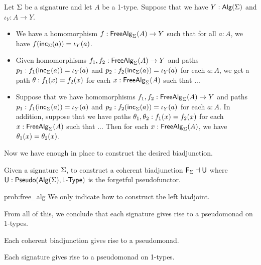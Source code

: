 \begin{corollary}
Let $\Sigma$ be a signature and let $A$ be a 1-type.
Suppose that we have $Y : \mathsf{Alg}(\Sigma)$ and $\iota_Y : A \rightarrow Y$.
\begin{itemize}
	\item We have a homomorphism $f : \mathsf{FreeAlg}_{\Sigma}(A) \rightarrow Y$ such that for all $a : A$, we have $f(\mathsf{inc}_{\Sigma}(a)) = \iota_Y(a)$.
	\item
	Given homomorphisms $f_1, f_2 : \mathsf{FreeAlg}_{\Sigma}(A) \rightarrow Y$
	and paths $p_1 : f_1(\mathsf{inc}_{\Sigma}(a)) = \iota_Y(a)$ and $p_2 : f_2(\mathsf{inc}_{\Sigma}(a)) = \iota_Y(a)$ for each $a : A$,
	we get a path $\theta : f_1(x) = f_2(x)$ for each $x : \mathsf{FreeAlg}_{\Sigma}(A)$
	such that ...
	\item
	Suppose that we have homomorphisms $f_1, f_2 : \mathsf{FreeAlg}_{\Sigma}(A) \rightarrow Y$
	and paths $p_1 : f_1(\mathsf{inc}_{\Sigma}(a)) = \iota_Y(a)$ and $p_2 : f_2(\mathsf{inc}_{\Sigma}(a)) = \iota_Y(a)$ for each $a : A$.
	In addition, suppose that we have paths $\theta_1, \theta_2 : f_1(x) = f_2(x)$ for each $x : \mathsf{FreeAlg}_{\Sigma}(A)$
	such that ...
	Then for each $x : \mathsf{FreeAlg}_{\Sigma}(A)$, we have $\theta_1(x) = \theta_2(x)$.
\end{itemize} 
\end{corollary}

Now we have enough in place to construct the desired biadjunction.

\begin{problem}
\label{prob:free_alg}
Given a signature $\Sigma$, to construct a coherent biadjunction $\mathsf{F}_{\Sigma} \dashv \mathsf{U}$ where $\mathsf{U} : \mathsf{Pseudo}(\mathsf{Alg}(\Sigma), 1\mbox{-}\mathsf{Type})$ is the forgetful pseudofunctor.
\end{problem}

\begin{construction}{prob:free_alg}
We only indicate how to construct the left biadjoint.
\end{construction}

From all of this, we conclude that each signature gives rise to a pseudomonad on 1-types.

\begin{proposition}
Each coherent biadjunction gives rise to a pseudomonad.
\end{proposition}

\begin{corollary}
Each signature gives rise to a pseudomonad on 1-types.
\end{corollary}